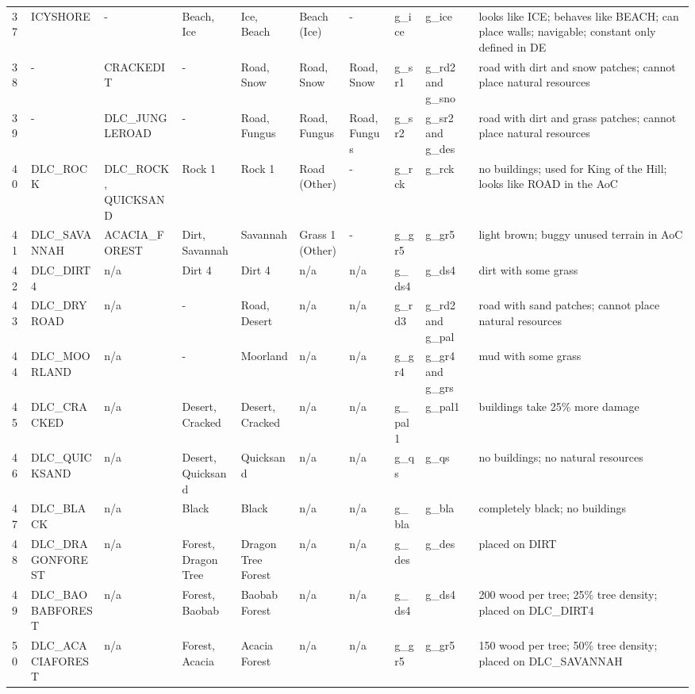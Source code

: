 \begin{appendices}
\begin{landscape}
\begin{longtable}{@{}p{5mm}|p{25mm}p{23mm}|p{14mm}p{14mm}p{14mm}p{14mm}|p{10mm}p{15mm}|p{45mm}@{}}
            37	&  ICYSHORE	& -	& Beach, Ice	& Ice, Beach	& Beach (Ice)	& -	& g\_ice	& g\_ice		& looks like ICE; behaves like BEACH; can place walls; navigable; constant only defined in DE \\
            38	& -	& CRACKEDIT	& -	& Road, Snow	& Road, Snow	& Road, Snow	& g\_sr1	& g\_rd2 and g\_sno		& road with dirt and snow patches; cannot place natural resources \\
            39	& -	& DLC\_JUNGLEROAD	& -	& Road, Fungus	& Road, Fungus	& Road, Fungus	& g\_sr2	& g\_sr2 and g\_des		& road with dirt and grass patches; cannot place natural resources \\
            40	& DLC\_ROCK	& DLC\_ROCK, QUICKSAND	& Rock 1	& Rock 1	& Road (Other)	& -	& g\_rck	& g\_rck		& no buildings; used for King of the Hill; looks like ROAD in the AoC \\
            41	& DLC\_SAVANNAH	& ACACIA\_FOREST	& Dirt, Savannah	& Savannah	& Grass 1 (Other)	& -	& g\_gr5	& g\_gr5		& light brown; buggy unused terrain in AoC  \\
            42	& DLC\_DIRT4	& n/a	& Dirt 4	& Dirt 4	& n/a	& n/a	& g\_ds4	& g\_ds4		& dirt with some grass \\
            43	& DLC\_DRYROAD	& n/a	& -	& Road, Desert	& n/a	& n/a	& g\_rd3	& g\_rd2 and g\_pal		& road with sand patches; cannot place natural resources \\
            44	& DLC\_MOORLAND	& n/a	& -	& Moorland	& n/a	& n/a	& g\_gr4	& g\_gr4 and g\_grs		& mud with some grass \\
            45	& DLC\_CRACKED	& n/a	& Desert, Cracked	& Desert, Cracked	& n/a	& n/a	& g\_pal1	& g\_pal1		& buildings take 25\% more damage \\
            46	& DLC\_QUICKSAND	& n/a	& Desert, Quicksand	& Quicksand	& n/a	& n/a	& g\_qs	& g\_qs		& no buildings; no natural resources \\
            47	& DLC\_BLACK	& n/a	& Black	& Black	& n/a	& n/a	& g\_bla	& g\_bla		& completely black; no buildings \\
            48	& DLC\_DRAGONFOREST	& n/a	& Forest, Dragon Tree	& Dragon Tree Forest	& n/a	& n/a	& g\_des	& g\_des		& placed on DIRT \\
            49	& DLC\_BAOBABFOREST	& n/a	& Forest, Baobab	& Baobab Forest	& n/a	& n/a	& g\_ds4	& g\_ds4		& 200 wood per tree; 25\% tree density; placed on DLC\_DIRT4 \\
            50	& DLC\_ACACIAFOREST	& n/a	& Forest, Acacia	& Acacia Forest	& n/a	& n/a	& g\_gr5	& g\_gr5		& 150 wood per tree; 50\% tree density; placed on DLC\_SAVANNAH \\

\end{longtable}
\end{landscape}
\end{appendices}
